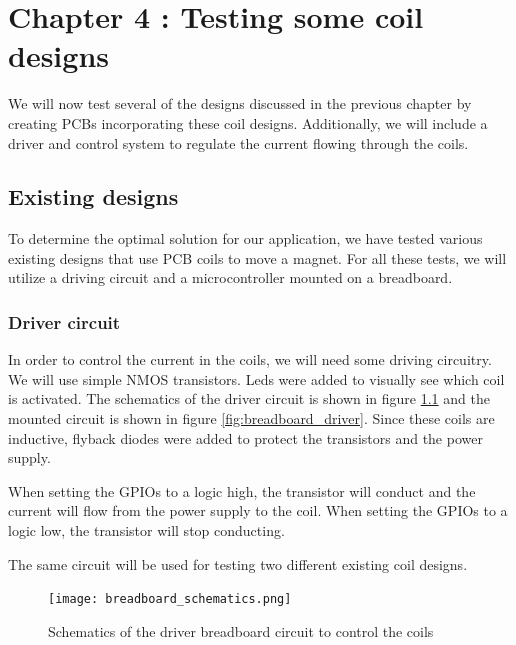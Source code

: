 
\chapter{Chapter 4 : Testing some coil designs}

We will now test several of the designs discussed in the previous chapter by creating PCBs incorporating these coil designs. Additionally, we will include a driver and control system to regulate the current flowing through the coils.

\section{Existing designs}

To determine the optimal solution for our application, we have tested various existing designs that use PCB coils to move a magnet. For all these tests, we will utilize a driving circuit and a microcontroller mounted on a breadboard.

\subsection{Driver circuit}

In order to control the current in the coils, we will need some driving circuitry. We will use simple NMOS transistors. Leds were added to visually see which coil is activated. The schematics of the driver circuit is shown in figure \ref{fig:breadboard_schematics} and the mounted circuit is shown in figure \ref{fig:breadboard_driver}. Since these coils are inductive, flyback diodes were added to protect the transistors and the power supply.

When setting the GPIOs to a logic high, the transistor will conduct and the current will flow from the power supply to the coil. When setting the GPIOs to a logic low, the transistor will stop conducting.

The same circuit will be used for testing two different existing coil designs.

\begin{figure}[H]
	\centering
	\texttt{[image: breadboard\_schematics.png]}
	\caption[Schematics of the driver breadboard circuit to control the coils]{Schematics of the driver breadboard circuit to control the coils}
	\label{fig:breadboard_schematics}
\end{figure}

